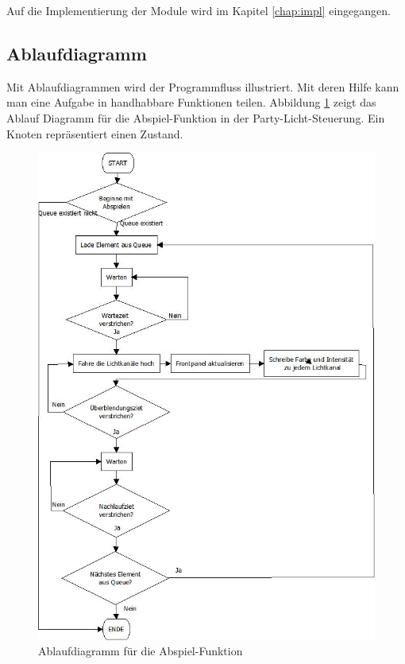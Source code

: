 Auf die Implementierung der Module wird im Kapitel \ref{chap:impl} eingegangen.

\subsection{Ablaufdiagramm }
Mit Ablaufdiagrammen wird der Programmfluss illustriert. Mit deren Hilfe kann man eine Aufgabe in handhabbare Funktionen teilen. Abbildung \ref{fig:plan01} zeigt das Ablauf Diagramm für die Abspiel-Funktion in der Party-Licht-Steuerung. Ein Knoten repräsentiert einen Zustand.
	\begin{figure}[!ht]
	\centering
		\includegraphics[height=0.9\textheight]{Pics/play-flowchart.jpeg}
	\caption{Ablaufdiagramm für die Abspiel-Funktion}
	\label{fig:plan01}
	\end{figure}	
		
